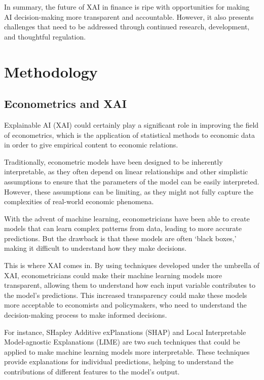 \documentclass[
  letterpaper,
  DIV=11,
  numbers=noendperiod]{scrartcl}
\begin{document}
In summary, the future of XAI in finance is ripe with opportunities for
making AI decision-making more transparent and accountable. However, it
also presents challenges that need to be addressed through continued
research, development, and thoughtful regulation.

\hypertarget{methodology}{%
\section{Methodology}\label{methodology}}

\hypertarget{econometrics-and-xai}{%
\subsection{Econometrics and XAI}\label{econometrics-and-xai}}

Explainable AI (XAI) could certainly play a significant role in
improving the field of econometrics, which is the application of
statistical methods to economic data in order to give empirical content
to economic relations.

Traditionally, econometric models have been designed to be inherently
interpretable, as they often depend on linear relationships and other
simplistic assumptions to ensure that the parameters of the model can be
easily interpreted. However, these assumptions can be limiting, as they
might not fully capture the complexities of real-world economic
phenomena.

With the advent of machine learning, econometricians have been able to
create models that can learn complex patterns from data, leading to more
accurate predictions. But the drawback is that these models are often
`black boxes,' making it difficult to understand how they make
decisions.

This is where XAI comes in. By using techniques developed under the
umbrella of XAI, econometricians could make their machine learning
models more transparent, allowing them to understand how each input
variable contributes to the model's predictions. This increased
transparency could make these models more acceptable to economists and
policymakers, who need to understand the decision-making process to make
informed decisions.

For instance, SHapley Additive exPlanations (SHAP) and Local
Interpretable Model-agnostic Explanations (LIME) are two such techniques
that could be applied to make machine learning models more
interpretable. These techniques provide explanations for individual
predictions, helping to understand the contributions of different
features to the model's output.
\end{document}

